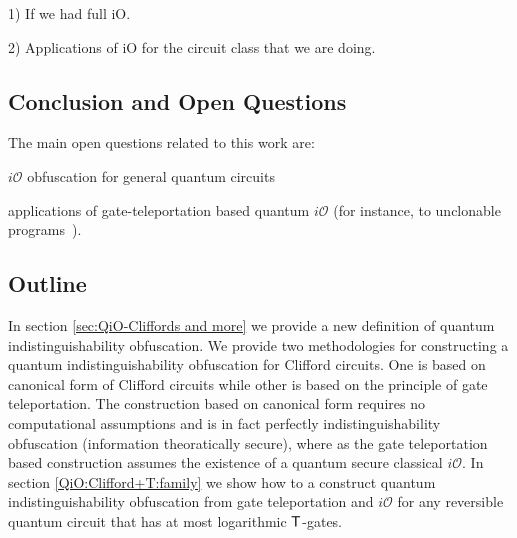 1) If we had full iO.

2) Applications of iO for the circuit class that we are doing.


\subsection{Conclusion and Open Questions}

The main open questions related to this work are:

$i\mathcal{O}$ obfuscation for general quantum circuits

applications of gate-teleportation based quantum $i\mathcal{O}$ (for instance, to unclonable programs~\cite{Aar09}).


\subsection*{Outline}
In section \ref{sec:QiO-Cliffords and more} we provide a new definition of quantum indistinguishability obfuscation. We provide two methodologies for constructing a quantum indistinguishability obfuscation for Clifford circuits. One is based on canonical form of Clifford circuits  while other is based on the principle of gate teleportation.  The construction based on canonical form requires no computational assumptions and is in fact perfectly indistinguishability obfuscation (information theoratically secure), where as the gate teleportation based construction assumes the existence of a quantum secure classical $i\mathcal{O}.$ In section \ref{QiO:Clifford+T:family} we show how to a construct quantum indistinguishability obfuscation from gate teleportation and $i\mathcal{O}$ for any reversible quantum circuit that has at most logarithmic ${\sf T}$-gates.

